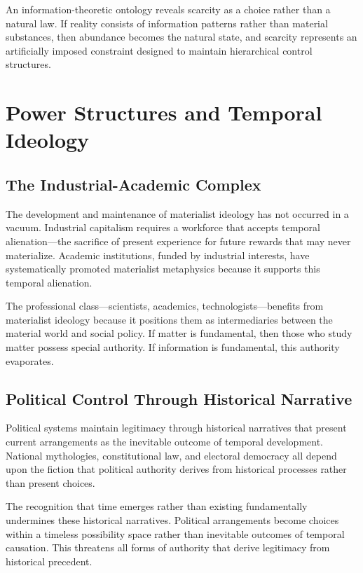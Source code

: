 \documentclass[12pt]{article}
\begin{document}
An information-theoretic ontology reveals scarcity as a choice rather than a natural law. If reality consists of information patterns rather than material substances, then abundance becomes the natural state, and scarcity represents an artificially imposed constraint designed to maintain hierarchical control structures.

\section{Power Structures and Temporal Ideology}

\subsection{The Industrial-Academic Complex}

The development and maintenance of materialist ideology has not occurred in a vacuum. Industrial capitalism requires a workforce that accepts temporal alienation—the sacrifice of present experience for future rewards that may never materialize. Academic institutions, funded by industrial interests, have systematically promoted materialist metaphysics because it supports this temporal alienation.

The professional class—scientists, academics, technologists—benefits from materialist ideology because it positions them as intermediaries between the material world and social policy. If matter is fundamental, then those who study matter possess special authority. If information is fundamental, this authority evaporates.

\subsection{Political Control Through Historical Narrative}

Political systems maintain legitimacy through historical narratives that present current arrangements as the inevitable outcome of temporal development. National mythologies, constitutional law, and electoral democracy all depend upon the fiction that political authority derives from historical processes rather than present choices.

The recognition that time emerges rather than existing fundamentally undermines these historical narratives. Political arrangements become choices within a timeless possibility space rather than inevitable outcomes of temporal causation. This threatens all forms of authority that derive legitimacy from historical precedent.
\end{document}

